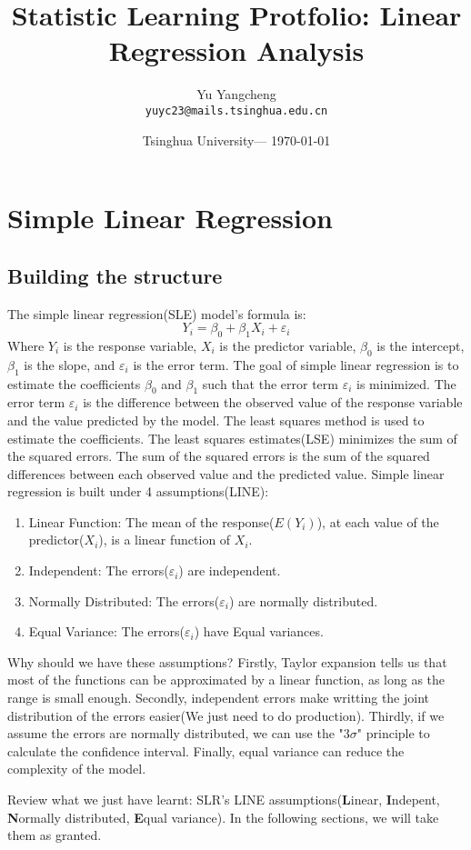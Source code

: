 \documentclass[main]{subfiles}
\title{Statistic Learning Protfolio: Linear Regression Analysis} %
\author{Yu Yangcheng\\ \texttt{yuyc23@mails.tsinghua.edu.cn}} %
\date{Tsinghua University--- \today} %
\begin{document}
\maketitle %


\section{Simple Linear Regression} %

\subsection{Building the structure}
The simple linear regression(SLE) model's formula is:
\begin{equation}
    Y_i = \beta_0 + \beta_1X_i + \varepsilon_i
\end{equation}
Where $Y_i$ is the response variable, $X_i$ is the predictor variable, $\beta_0$ is the intercept, $\beta_1$ is the slope, and $\varepsilon_i$ is the error term. The goal of simple linear regression is to estimate the coefficients $\beta_0$ and $\beta_1$ such that the error term $\varepsilon_i$ is minimized. The error term $\varepsilon_i$ is the difference between the observed value of the response variable and the value predicted by the model. The least squares method is used to estimate the coefficients. The least squares estimates(LSE) minimizes the sum of the squared errors. The sum of the squared errors is the sum of the squared differences between each observed value and the predicted value.
Simple linear regression is built under 4 assumptions(LINE):
\begin{enumerate}
    \item Linear Function: The mean of the response($E(Y_i)$), at each value of the predictor($X_i$), is a linear function of $X_i$.
    \item Independent: The errors($\varepsilon_i$) are independent.
    \item Normally Distributed: The errors($\varepsilon_i$) are normally distributed.
    \item Equal Variance: The errors($\varepsilon_i$) have Equal variances.
\end{enumerate}
Why should we have these assumptions? Firstly, Taylor expansion tells us that most of the functions can be approximated by a linear function, as long as the range is small enough. Secondly, independent errors make writting the joint distribution of the errors easier(We just need to do production). Thirdly, if we assume the errors are normally distributed, we can use the "$3 \sigma$" principle to calculate the confidence interval. Finally, equal variance can reduce the complexity of the model.
\begin{info}
    Review what we just have learnt: SLR's LINE assumptions({\bf L}inear, {\bf I}ndepent, {\bf N}ormally distributed, {\bf E}qual variance). In the following sections, we will take them as granted.
\end{info}
\end{document}
